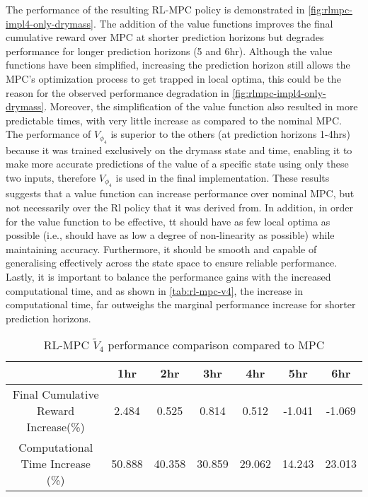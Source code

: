 The performance of the resulting RL-MPC policy is demonstrated in \autoref{fig:rlmpc-impl4-only-drymass}. The addition of the value functions improves the final cumulative reward over MPC at shorter prediction horizons but degrades performance for longer prediction horizons (5 and 6hr). Although the value functions have been simplified, increasing the prediction horizon still allows the MPC's optimization process to get trapped in local optima, this could be the reason for the observed performance degradation in \autoref{fig:rlmpc-impl4-only-drymass}. Moreover, the simplification of the value function also resulted in more predictable times, with very little increase as compared to the nominal MPC.\\

The performance of ${V}_{\phi_4}$ is superior to the others (at prediction horizons 1-4hrs) because it was trained exclusively on the drymass state and time, enabling it to make more accurate predictions of the value of a specific state using only these two inputs, therefore ${V}_{\phi_4}$ is used in the final implementation. These results suggests that a value function can increase performance over nominal MPC, but not necessarily over the Rl policy that it was derived from. In addition, in order for the value function to be effective, tt should have as few local optima as possible (i.e., should have as low a degree of non-linearity as possible) while maintaining accuracy. Furthermore, it should be smooth and capable of generalising effectively across the state space to ensure reliable performance. Lastly, it is important to balance the performance gains with the increased computational time, and as shown in \autoref{tab:rl-mpc-v4}, the increase in computational time, far outweighs the marginal performance increase for shorter prediction horizons.

\begin{table}[H]
	\centering
	\begin{tabular}{|c|cccccc|}
		\hline
		&1hr&2hr&3hr&4hr&5hr&6hr\\
		\hline
		Final Cumulative Reward Increase(\%) &2.484 &0.525&0.814&0.512&-1.041& -1.069\\
		\hline
		Computational Time Increase     (\%) &50.888 &40.358&30.859&29.062&14.243& 23.013\\
		\hline
	\end{tabular}
	\caption{RL-MPC $\tilde{V}_4$ performance comparison compared to MPC}
	\label{tab:rl-mpc-v4}
\end{table}



